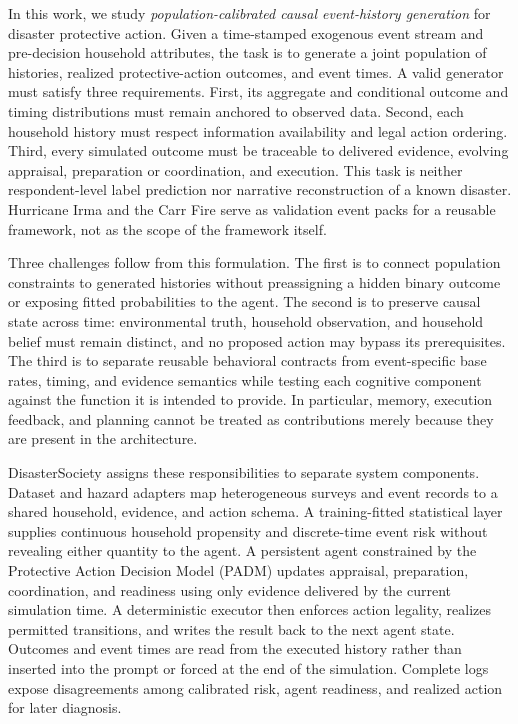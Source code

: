 \documentclass[journal]{IEEEtran}
\newcommand{\method}{DisasterSociety}
\begin{document}
In this work, we study \emph{population-calibrated causal event-history
generation} for disaster protective action. Given a time-stamped exogenous
event stream and pre-decision household attributes, the task is to generate a
joint population of histories, realized protective-action outcomes, and event
times. A valid generator must satisfy three requirements. First, its aggregate
and conditional outcome and timing distributions must remain anchored to
observed data. Second, each household history must respect information
availability and legal action ordering. Third, every simulated outcome must be
traceable to delivered evidence, evolving appraisal, preparation or
coordination, and execution. This task is neither respondent-level label
prediction nor narrative reconstruction of a known disaster. Hurricane Irma
and the Carr Fire serve as validation event packs for a reusable framework,
not as the scope of the framework itself.

Three challenges follow from this formulation. The first is to connect
population constraints to generated histories without preassigning a hidden
binary outcome or exposing fitted probabilities to the agent. The second is
to preserve causal state across time: environmental truth, household
observation, and household belief must remain distinct, and no proposed action
may bypass its prerequisites. The third is to separate reusable behavioral
contracts from event-specific base rates, timing, and evidence semantics while
testing each cognitive component against the function it is intended to
provide. In particular, memory, execution feedback, and planning cannot be
treated as contributions merely because they are present in the architecture.

\method{} assigns these responsibilities to separate system components.
Dataset and hazard adapters map heterogeneous surveys and event records to a
shared household, evidence, and action schema. A training-fitted statistical
layer supplies continuous household propensity and discrete-time event risk
without revealing either quantity to the agent. A persistent agent constrained
by the Protective Action Decision Model (PADM) updates appraisal, preparation,
coordination, and readiness using only evidence delivered by the current
simulation time. A deterministic executor
then enforces action legality, realizes permitted transitions, and writes the
result back to the next agent state. Outcomes and event times are read from
the executed history rather than inserted into the prompt or forced at the end
of the simulation. Complete logs expose disagreements among calibrated risk,
agent readiness, and realized action for later diagnosis.
\end{document}
